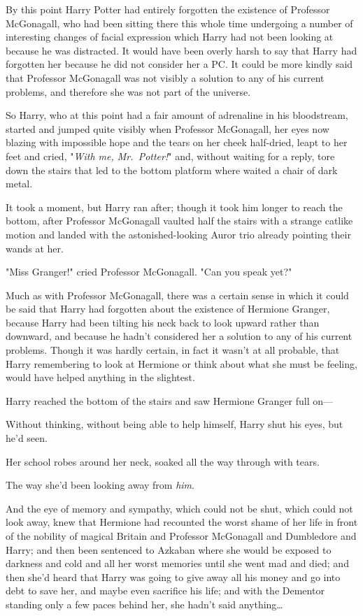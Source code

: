 By this point Harry Potter had entirely forgotten the existence of Professor
McGonagall, who had been sitting there this whole time undergoing a number of
interesting changes of facial expression which Harry had not been looking at
because he was distracted. It would have been overly harsh to say that Harry
had forgotten her because he did not consider her a PC. It could be more kindly
said that Professor McGonagall was not visibly a solution to any of his current
problems, and therefore she was not part of the universe.

So Harry, who at this point had a fair amount of adrenaline in his bloodstream,
started and jumped quite visibly when Professor McGonagall, her eyes now
blazing with impossible hope and the tears on her cheek half-dried, leapt to
her feet and cried, "\emph{With me, Mr.~Potter!}" and, without waiting for a
reply, tore down the stairs that led to the bottom platform where waited a
chair of dark metal.

It took a moment, but Harry ran after; though it took him longer to reach the
bottom, after Professor McGonagall vaulted half the stairs with a strange
catlike motion and landed with the astonished-looking Auror trio already
pointing their wands at her.

"Miss Granger!" cried Professor McGonagall. "Can you speak yet?"

Much as with Professor McGonagall, there was a certain sense in which it could
be said that Harry had forgotten about the existence of Hermione Granger,
because Harry had been tilting his neck back to look upward rather than
downward, and because he hadn't considered her a solution to any of his current
problems. Though it was hardly certain, in fact it wasn't at all probable, that
Harry remembering to look at Hermione or think about what she must be feeling,
would have helped anything in the slightest.

Harry reached the bottom of the stairs and saw Hermione Granger full on---

Without thinking, without being able to help himself, Harry shut his eyes, but
he'd seen.

Her school robes around her neck, soaked all the way through with tears.

The way she'd been looking away from \emph{him}.

And the eye of memory and sympathy, which could not be shut, which could not
look away, knew that Hermione had recounted the worst shame of her life in
front of the nobility of magical Britain and Professor McGonagall and
Dumbledore and Harry; and then been sentenced to Azkaban where she would be
exposed to darkness and cold and all her worst memories until she went mad and
died; and then she'd heard that Harry was going to give away all his money and
go into debt to save her, and maybe even sacrifice his life; and with the Dementor
standing only a few paces behind her, she hadn't said anything{\ldots}

